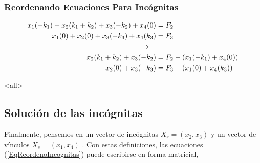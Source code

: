 \begin{frame}[label=FrameReordenarEcuaciones23]
  \frametitle<presentation>{Reordenando Ecuaciones Para Incógnitas}

\begin{equation}  \label{EqReordenoIncognitas}
    \begin{aligned}
      x_1 (-k_1) + x_2(k_1+k_2)+ x_3(-k_2) + x_4(0) &= F_2 \\  x_1 (0) + x_2(0)+ x_3(-k_3) + x_4(k_3) &= F_3 \\
      \quad \Rightarrow \quad & \\
      x_2(k_1+k_2)+ x_3(-k_2) &= F_2 - (x_1 (-k_1) + x_4(0) ) \\ x_2(0) + x_3(-k_3) &= F_3 - (x_1 (0) + x_4(k_3) )
    \end{aligned}
\end{equation}

\end{frame}

\mode<all>

\subsection{Solución de las incógnitas}

Finalmente, pensemos en un vector de incógnitas $X_r = (x_2, x_3)$   y un
vector de vínculos $X_s  = (x_1, x_4)$ . Con estas definiciones, las
ecuaciones (\ref{EqReordenoIncognitas})  puede escribirse en forma matricial, 

\mode*

